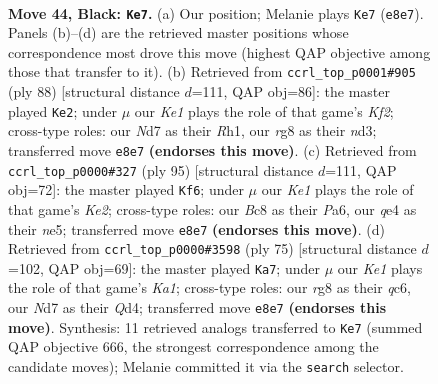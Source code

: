 \documentclass[11pt]{article}
\begin{document}
\clearpage

\begin{figure}[p]\centering
\begin{subfigure}{0.46\textwidth}\centering
\resizebox{\linewidth}{!}{%
\newchessgame
\chessboard[
  setfen={2b1k1R1/p2n3p/1P3r1B/4qP2/1p1pQ3/8/p3P3/1N1K4 b - - 1 44},
  showmover=false,
  pgfstyle=straightmove, color=movearrow, markmove={e8-e7}
]}
\caption{}
\end{subfigure}\hfill
\begin{subfigure}{0.46\textwidth}\centering
\resizebox{\linewidth}{!}{%
\newchessgame
\chessboard[
  setfen={2r4k/8/7p/4Pp1q/p2P3P/3nNQ2/P4K2/7R w - - 2 45},
  showmover=false,
  pgfstyle=straightmove, color=movearrow, markmove={f2-e2}
]}
\caption{}
\end{subfigure}
\\[4pt]
\begin{subfigure}{0.46\textwidth}\centering
\resizebox{\linewidth}{!}{%
\newchessgame
\chessboard[
  setfen={8/1p2k1R1/p2np3/3pNqp1/3P3P/Q7/1Pr2P2/5K2 b - - 4 48},
  showmover=false,
  pgfstyle=straightmove, color=movearrow, markmove={e7-f6}
]}
\caption{}
\end{subfigure}\hfill
\begin{subfigure}{0.46\textwidth}\centering
\resizebox{\linewidth}{!}{%
\newchessgame
\chessboard[
  setfen={k7/8/p1Qpp3/2pn2p1/P2q2P1/3P1P2/1r1B3P/1R5K b - - 15 38},
  showmover=false,
  pgfstyle=straightmove, color=movearrow, markmove={a8-a7}
]}
\caption{}
\end{subfigure}
\caption{\textbf{Move 44, Black: \texttt{Ke7}.} (a) Our position; Melanie plays \texttt{Ke7} (\texttt{e8e7}). Panels (b)--(d) are the retrieved master positions whose correspondence most drove this move (highest QAP objective among those that transfer to it). (b) Retrieved from \texttt{ccrl\_top\_p0001\#905} (ply 88) [structural distance $d$=111, QAP obj=86]: the master played \texttt{Ke2}; under $\mu$ our \emph{Ke1} plays the role of that game's \emph{Kf2}; cross-type roles: our \emph{N}d7 as their \emph{R}h1, our \emph{r}g8 as their \emph{n}d3; transferred move \texttt{e8e7} \textbf{(endorses this move)}. (c) Retrieved from \texttt{ccrl\_top\_p0000\#327} (ply 95) [structural distance $d$=111, QAP obj=72]: the master played \texttt{Kf6}; under $\mu$ our \emph{Ke1} plays the role of that game's \emph{Ke2}; cross-type roles: our \emph{B}c8 as their \emph{P}a6, our \emph{q}e4 as their \emph{n}e5; transferred move \texttt{e8e7} \textbf{(endorses this move)}. (d) Retrieved from \texttt{ccrl\_top\_p0000\#3598} (ply 75) [structural distance $d$=102, QAP obj=69]: the master played \texttt{Ka7}; under $\mu$ our \emph{Ke1} plays the role of that game's \emph{Ka1}; cross-type roles: our \emph{r}g8 as their \emph{q}c6, our \emph{N}d7 as their \emph{Q}d4; transferred move \texttt{e8e7} \textbf{(endorses this move)}. Synthesis: 11 retrieved analogs transferred to \texttt{Ke7} (summed QAP objective 666, the strongest correspondence among the candidate moves); Melanie committed it via the \texttt{search} selector.}
\label{fig:thought-m87}
\end{figure}
\end{document}
